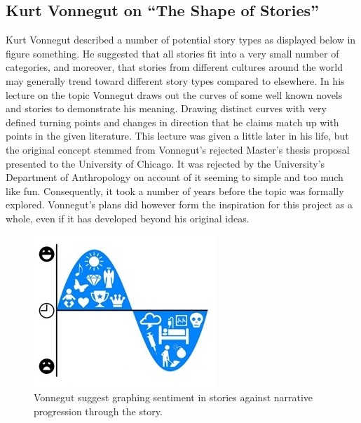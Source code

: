 \documentclass{article}
\begin{document}
    \subsection{Kurt Vonnegut on ``The Shape of Stories''}
        Kurt Vonnegut described a number of potential story types as displayed below in figure something. He suggested that all stories fit into a very small number of categories, and moreover, that stories from different cultures around the world may generally trend toward different story types compared to elsewhere. In his lecture on the topic \citep{vonnegutLecture} Vonnegut draws out the curves of some well known novels and stories to demonstrate his meaning. Drawing distinct curves with very defined turning points and changes in direction that he claims match up with points in the given literature. This lecture was given a little later in his life, but the original concept stemmed from Vonnegut's rejected Master's thesis proposal presented to the University of Chicago. It was rejected by the University's Department of Anthropology on account of it seeming to simple and too much like fun. Consequently, it took a number of years before the topic was formally explored. Vonnegut's plans did however form the inspiration for this project as a whole, even if it has developed beyond his original ideas.
        \begin{figure}
            \centering
            \includegraphics{Figures/Misc/sentimentGraph}
            \caption{Vonnegut suggest graphing sentiment in stories against narrative progression through the story.}
            \label{fig:sentiGraph}
        \end{figure}
\end{document}
